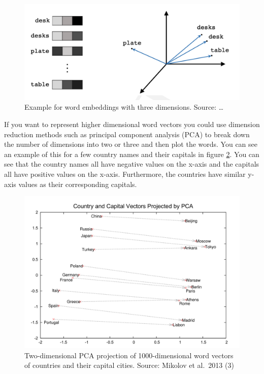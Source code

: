 \documentclass[]{krantz}
\begin{document}
\begin{figure}
\centering
\includegraphics{figures/01-01-foundations-applications-of-modern-NLP/01-01_word_embeddings_1.png}
\caption{\label{fig:word-embedding1}Example for word embeddings with three dimensions. Source: \ldots{}}
\end{figure}

If you want to represent higher dimensional word vectors you could use dimension reduction methods such as principal component analysis (PCA) to break down the number of dimensions into two or three and then plot the words. You can see an example of this for a few country names and their capitals in figure \ref{fig:word-embedding2}. You can see that the country names all have negative values on the x-axis and the capitals all have positive values on the x-axis. Furthermore, the countries have similar y-axis values as their corresponding capitals.

\begin{figure}
\centering
\includegraphics{figures/01-01-foundations-applications-of-modern-NLP/01-01_word_embeddings_2.png}
\caption{\label{fig:word-embedding2}Two-dimensional PCA projection of 1000-dimensional word vectors of countries and their capital cities. Source: Mikolov et al.~2013 (3)}
\end{figure}
\end{document}
